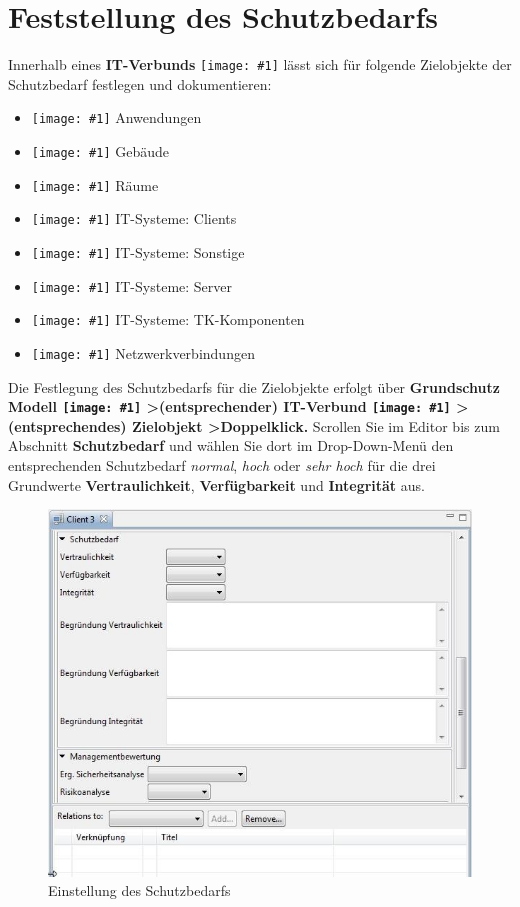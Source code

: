 \documentclass[a4paper,10pt]{book}
\newcommand{\icon}[1]{\texttt{[image: \#1]}}
\begin{document}
\section{Feststellung des Schutzbedarfs}
Innerhalb eines \textbf{IT-Verbunds} \icon{Icon/GS_Modell.png} lässt sich für folgende Zielobjekte der Schutzbedarf festlegen und  dokumentieren:
\begin{itemize}
 \item \icon{Icon/Anwendung.png} Anwendungen
 \item \icon{Icon/Gebaeude.png} Gebäude
 \item \icon{Icon/Raeume.png} Räume
 \item \icon{Icon/Clients.png} IT-Systeme: Clients
 \item \icon{Icon/Sonstige.png} IT-Systeme: Sonstige
 \item \icon{Icon/Server.png} IT-Systeme: Server
 \item \icon{Icon/Tk_komponenten.png} IT-Systeme: TK-Komponenten
 \item \icon{Icon/Netzwerkverbindungen.png} Netzwerkverbindungen
\end{itemize}
Die Festlegung des Schutzbedarfs für die Zielobjekte erfolgt über \textbf{Grundschutz Modell \icon{Icon/GS_Modell.png} \textgreater (entsprechender) IT-Verbund \icon{Icon/GS_Modell.png} \textgreater (entsprechendes) Zielobjekt \textgreater Doppelklick.} Scrollen Sie im Editor bis zum Abschnitt \textbf{Schutzbedarf} und wählen Sie dort im Drop-Down-Menü den entsprechenden Schutzbedarf \textit{normal}, \textit{hoch} oder \textit{sehr hoch} für die drei Grundwerte \textbf{Vertraulichkeit}, \textbf{Verfügbarkeit} und \textbf{Integrität} aus.
\newline
\begin{figure}[htb!]
  \centering
  \includegraphics[scale=.57]{Screenshot/Schutzbedarf.jpg}
  \caption{\label{Einstellung des Schutzbedarfs} Einstellung des Schutzbedarfs}
\end{figure}
\newline
\end{document}
